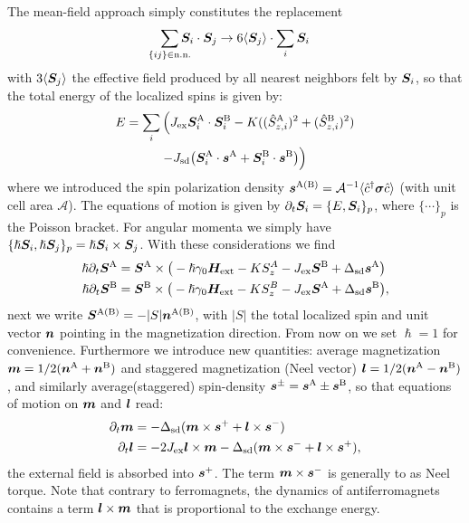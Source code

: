The mean-field approach simply constitutes the replacement
\begin{equation}
    \sum_{\mathclap{\{ij\}\in\text{n.n.}}} \bb{S}_i\cdot\bb{S}_j\rightarrow6\langle\bb{S}_j\rangle\cdot\sum_i \bb{S}_i
\end{equation}
with $3 \langle \boldsymbol{S}_j\rangle$ the effective field produced by all nearest neighbors felt by $\boldsymbol{S}_i$, so that the total energy of the localized spins is given by:
\begin{multline}
    E = \sum_{i} \Big(J_{\text{ex}}\boldsymbol{S}^\text{A}_i\cdot\boldsymbol{S}^\text{B}_i 
    - K((\hat{S}_{z,i}^\text{A})^2+(\hat{S}_{z,i}^\text{B})^2)\\
    -J_{\text{sd}}\big(\boldsymbol{S}^\text{A}_i\cdot\boldsymbol{s}^\text{A}+\boldsymbol{S}^\text{B}_i\cdot\boldsymbol{s}^\text{B}\big)
        \Big)
        \label{intro:eq:E}
\end{multline}
where we introduced the spin polarization density $\boldsymbol{s}^\text{A(B)} = \mathcal{A}^{-1}\langle \hat{c}^\dagger \boldsymbol{\sigma}\hat{c}\rangle$ (with unit cell area $\mathcal{A}$). 
The equations of motion is given by $\partial_t \boldsymbol{S}_i = \{E,\boldsymbol{S}_i\}_p$, where $\{\cdots\}_p$ is the Poisson bracket. For angular momenta we simply have $\{\hslash \boldsymbol{S}_i,\hslash \boldsymbol{S}_j\}_p=\hslash \boldsymbol{S}_i\times\boldsymbol{S}_j$. With these considerations we find
\begin{align}
   \hslash \partial_t \boldsymbol{S}^\text{A} &= \boldsymbol{S}^\text{A}\times\big( -\hslash\gamma_0\boldsymbol{H}_\text{ext}-KS^A_z-J_\text{ex}\boldsymbol{S}^\text{B}+\Delta_\text{sd}\boldsymbol{s}^\text{A}\big)\\
      \hslash \partial_t \boldsymbol{S}^\text{B} &= \boldsymbol{S}^\text{B}\times\big( -\hslash\gamma_0\boldsymbol{H}_\text{ext}-KS^B_z-J_\text{ex}\boldsymbol{S}^\text{A}+\Delta_\text{sd}\boldsymbol{s}^\text{B}\big),
\end{align}
next we write $\boldsymbol{S}^\text{A(B)}=-|S|\boldsymbol{n}^\text{A(B)}$, with $|S|$ the total localized spin and unit vector $\boldsymbol{n}$ pointing in the magnetization direction. From now on we set $\hslash=1$ for convenience. Furthermore we introduce new quantities: average magnetization $\boldsymbol{m}=1/2(\boldsymbol{n}^\text{A}+\boldsymbol{n}^\text{B})$ and staggered magnetization (Neel vector) $\boldsymbol{l}=1/2(\boldsymbol{n}^\text{A}-\boldsymbol{n}^\text{B})$, and similarly average(staggered) spin-density $\boldsymbol{s}^\pm=\boldsymbol{s}^\text{A}\pm\boldsymbol{s}^\text{B}$, so that equations of motion on $\boldsymbol{m}$ and $\boldsymbol{l}$ read:
\begin{align}
    \partial_t \boldsymbol{m} &= -\Delta_\text{sd}(\boldsymbol{m}\times\boldsymbol{s}^++\boldsymbol{l}\times\boldsymbol{s}^-)\label{intro:eq:dm}\\
        \partial_t \boldsymbol{l} &=-2J_\text{ex}\boldsymbol{l}\times\boldsymbol{m} -\Delta_\text{sd}(\boldsymbol{m}\times\boldsymbol{s}^-+\boldsymbol{l}\times\boldsymbol{s}^+),\label{intro:eq:dl}
\end{align}
the external field is absorbed into $\boldsymbol{s}^+$. The term $\boldsymbol{m}\times\boldsymbol{s}^-$ is generally to as Neel torque. Note that contrary to ferromagnets, the dynamics of antiferromagnets contains a term $\boldsymbol{l}\times\boldsymbol{m}$ that is proportional to the exchange energy. 

